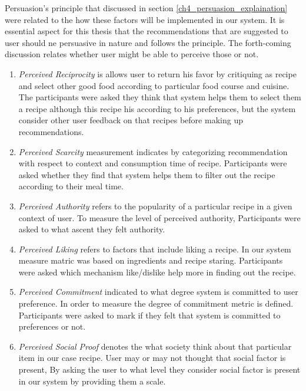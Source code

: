 Persuasion’s principle that discussed in section \ref{ch4_persuasion_explaination} were related to the how these factors will be implemented in our system.  It is essential aspect for this thesis that the recommendations that are suggested to user should ne persuasive in nature and follows the principle. The forth-coming discussion relates whether user might be able to perceive those or not.

  \begin{enumerate}
  	\item \textit{Perceived Reciprocity} is allows user to return his favor by critiquing as recipe and select other good food according to particular food course and cuisine. The participants were asked they think that system helps them to select them a recipe although this recipe his according to his preferences, but the system consider other user feedback on that recipes before making up recommendations.
  	
  	\item \textit{Perceived Scarcity} measurement indicates by categorizing recommendation with respect to context and consumption time of recipe. Participants were asked whether they find that system helps them to filter out the recipe according to their meal time.      

  	\item \textit{Perceived Authority} refers to the popularity of a particular recipe in a given context of user. To measure the level of perceived authority, Participants were asked to what ascent they felt authority. 
  	
  	\item \textit{Perceived Liking} refers to factors that include liking a recipe. In our system measure matric was based on ingredients and recipe staring. Participants were asked which mechanism like/dislike help more in finding out the recipe. 	  
  	
  	\item \textit{Perceived Commitment} indicated to what degree system is committed to user preference. In order to measure the degree of commitment metric is defined. Participants were asked to mark if they felt that system is committed to preferences or not.	  
  	  	
  	\item \textit{Perceived Social Proof} denotes the what society think about that particular item in our case recipe. User may or may not thought that social factor is present, By asking the user to what level they consider social factor is present in our system by providing them a scale.   
  \end{enumerate}
  

